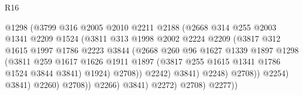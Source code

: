 \begin{lexlean}{R16}
\begin{coremodule}
                                    @1298
                                    (@3799
                                      @316
                                      @2005
                                      @2010
                                      @2211
                                      @2188
                                      (@2668
                                        @314
                                        @255
                                        @2003
                                        @1341
                                        @2209
                                        @1524
                                        (@3811
                                          @313
                                          @1998
                                          @2002
                                          @2224
                                          @2209
                                          (@3817
                                            @312
                                            @1615
                                            @1997
                                            @1786
                                            @2223
                                            @3844
                                            (@2668
                                              @260
                                              @96
                                              @1627
                                              @1339
                                              @1897
                                              @1298
                                              (@3811
                                                @259
                                                @1617
                                                @1626
                                                @1911
                                                @1897
                                                (@3817 @255 @1615 @1341 @1786 @1524 @3844 @3841)
                                                @1924)
                                              @2708))
                                          @2242)
                                        @3841)
                                      @2248)
                                    @2708))
                                @2254)
                              @3841)
                            @2260)
                          @2708))
                      @2266)
                    @3841)
                  @2272)
                @2708)
              @2277))

\end{coremodule}
\end{lexlean}
